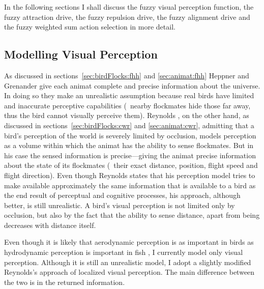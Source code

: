 In the following sections I shall discuss the fuzzy visual perception function, the fuzzy attraction drive, the fuzzy repulsion drive, the fuzzy alignment drive and the fuzzy weigh\-t\-ed sum action selection in more detail.

\subsection{Modelling Visual Perception}
As discussed in sections~\ref{sec:birdFlocks:fhh} and \ref{sec:animat:fhh} Heppner and Grenander \cite{heppner:1990} give each animat complete and precise information about the universe. In doing so they make an unrealistic assumption because real birds have limited and inaccurate perceptive capabilities (\eg\ nearby flockmates hide those far away, thus the bird cannot visually perceive them). Reynolds \cite{reynolds:1987}, on the other hand, as discussed in sections~\ref{sec:birdFlocks:cwr} and \ref{sec:animat:cwr}, admitting that a bird's perception of the world is severely limited by occlusion, models perception as a volume within which the animat has the ability to sense flockmates. But in his case the sensed information is precise---giving the animat precise information about the state of its flockmates (\ie\ their exact distance, position, flight speed and flight direction). Even though Reynolds \cite{reynolds:1987} states that his perception model tries to make available approximately the same information that is available to a bird as the end result of perceptual and cognitive processes, his approach, although better, is still unrealistic. A bird's visual perception is not limited only by occlusion, but also by the fact that the ability to sense distance, apart from being  decreases with distance itself. 

Even though it is likely that aerodynamic perception is as important in birds as hydrodynamic perception is important in fish \cite{ward:2001}, I currently model only visual perception. Although it is still an unrealistic model, I adopt a slightly modified Reynolds's \cite{reynolds:1999} approach of localized visual perception. The main difference between the two is in the returned information. 

